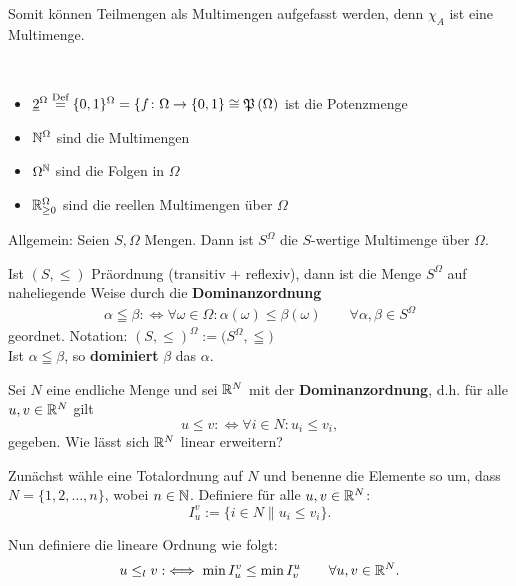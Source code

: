 Somit können Teilmengen als Multimengen aufgefasst werden, denn $\chi_A$ ist eine Multimenge.

\begin{beispiel}\
	\begin{itemize}
		\item $\underline{2}^\Omega\overset{\text{Def}}{=}\lbrace0,1\rbrace^\Omega=\lbrace f\colon\Omega\to\lbrace0,1\rbrace\cong\mathfrak{P}\left(\Omega\right)$ ist die Potenzmenge
		\item $\mathbb{N}^\Omega$ sind die Multimengen
		\item $\Omega^{\mathbb{N}}$ sind die Folgen in $\Omega$
		\item $\mathbb{R}_{\geq0}^\Omega$ sind die reellen Multimengen über $\Omega$
	\end{itemize}
\end{beispiel}

Allgemein: Seien $S,\Omega$ Mengen. Dann ist $S^\Omega$ die $S$-wertige Multimenge über $\Omega$.

\begin{lemma}
	Ist $(S,\leq)$ Präordnung (transitiv + reflexiv), dann ist die Menge $S^\Omega$ auf naheliegende Weise durch die \textbf{Dominanzordnung}
	\begin{align*}
		\alpha\leqq\beta:\Longleftrightarrow\forall\omega\in\Omega:\alpha(\omega)\leq\beta(\omega)
		\qquad\forall\alpha,\beta\in S^\Omega
	\end{align*}
	geordnet. 
	Notation: $(S,\leq)^\Omega:=\big(S^\Omega,\leqq\big)$\\
	Ist $\alpha\leqq\beta$, so \textbf{dominiert} $\beta$ das $\alpha$.
\end{lemma}

\begin{aufgabe}
    Sei $N$ eine endliche Menge und 
    sei $\mathbb{R}^N$ mit der \textbf{Dominanzordnung}, d.h. für alle $u,v \in \mathbb{R}^N$ gilt
    $$u \leq v :\iff \forall i \in N:u_i \leq v_i,$$
    gegeben.
    Wie lässt sich $\mathbb{R}^N$ linear erweitern?
\end{aufgabe}

\begin{lösung}
    Zunächst wähle eine Totalordnung auf $ N $ und benenne die Elemente so um, dass
    $N = \{1,2,\ldots,n\}$, wobei $n \in \mathbb{N}$.
    Definiere für alle $u,v \in \mathbb{R}^N$:
    $$ I^v_u := \{i \in N \| u_i \leq v_i\}.$$

    Nun definiere die lineare Ordnung wie folgt:
    $$ u \leq_l v :\iff \min I^v_u \leq \min I^u_v
    \qquad\forall u,v\in\mathbb{R}^N.$$
\end{lösung}

